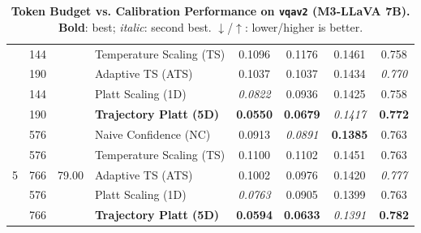 \begin{table}[t]
\begin{tabular}{ccclcccc}
 & 144 &  & Temperature Scaling (TS) & 0.1096 & 0.1176 & 0.1461 & 0.758 \\
 & 190 &  & Adaptive TS (ATS) & 0.1037 & 0.1037 & 0.1434 & \textit{0.770} \\
 & 144 &  & Platt Scaling (1D) & \textit{0.0822} & 0.0936 & 0.1425 & 0.758 \\
 & 190 &  & \textbf{Trajectory Platt (5D)} & \textbf{0.0550} & \textbf{0.0679} & \textit{0.1417} & \textbf{0.772} \\
\midrule
\multirow{5}{*}{5} & 576 & \multirow{5}{*}{79.00} & Naive Confidence (NC) & 0.0913 & \textit{0.0891} & \textbf{0.1385} & 0.763 \\
 & 576 &  & Temperature Scaling (TS) & 0.1100 & 0.1102 & 0.1451 & 0.763 \\
 & 766 &  & Adaptive TS (ATS) & 0.1002 & 0.0976 & 0.1420 & \textit{0.777} \\
 & 576 &  & Platt Scaling (1D) & \textit{0.0763} & 0.0905 & 0.1399 & 0.763 \\
 & 766 &  & \textbf{Trajectory Platt (5D)} & \textbf{0.0594} & \textbf{0.0633} & \textit{0.1391} & \textbf{0.782} \\
\bottomrule
\end{tabular}
\caption{\textbf{Token Budget vs. Calibration Performance on \texttt{vqav2} (M3-LLaVA 7B).} \textbf{Bold}: best; \textit{italic}: second best. $\downarrow$/$\uparrow$: lower/higher is better.}
\label{tab:token_budget_vqav2_m3}
\end{table}

